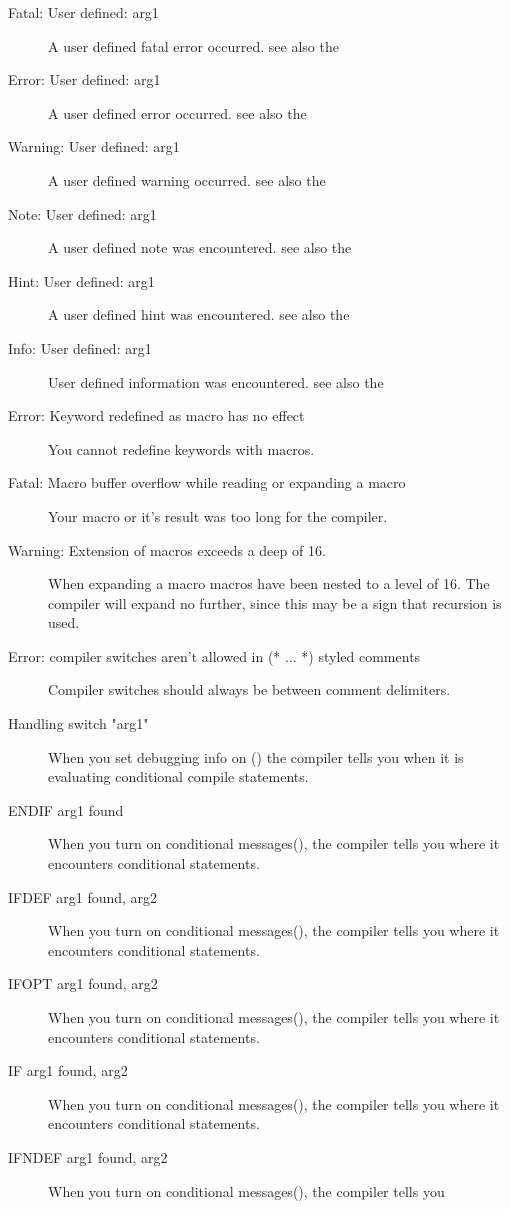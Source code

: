 \begin{description}
\item [Fatal: User defined: arg1]
 A user defined fatal error occurred. see also the \progref
\item [Error: User defined: arg1]
 A user defined error occurred. see also the \progref
\item [Warning: User defined: arg1]
 A user defined warning occurred. see also the \progref
\item [Note: User defined: arg1]
 A user defined note was encountered. see also the \progref
\item [Hint: User defined: arg1]
 A user defined hint was encountered. see also the \progref
\item [Info: User defined: arg1]
 User defined information was encountered. see also the \progref
\item [Error: Keyword redefined as macro has no effect]
 You cannot redefine keywords with macros.
\item [Fatal: Macro buffer overflow while reading or expanding a macro]
 Your macro or it's result  was too long for the compiler.
\item [Warning: Extension of macros exceeds a deep of 16.]
 When expanding a macro macros have been nested to a level of 16.
 The compiler will expand no further, since this may be a sign that 
 recursion is used.
\item [Error: compiler switches aren't allowed in (* ... *) styled comments]
 Compiler switches should always be between \var{\{ \}} comment delimiters. 
\item [Handling switch "arg1"]
 When you set debugging info on () the compiler tells you when it
 is evaluating conditional compile statements.
\item [ENDIF arg1 found]
 When you turn on conditional messages(), the compiler tells you 
 where it encounters conditional statements.
\item [IFDEF arg1 found, arg2]
 When you turn on conditional messages(), the compiler tells you 
 where it encounters conditional statements.
\item [IFOPT arg1 found, arg2]
 When you turn on conditional messages(), the compiler tells you 
 where it encounters conditional statements.
\item [IF arg1 found, arg2]
 When you turn on conditional messages(), the compiler tells you 
 where it encounters conditional statements.
\item [IFNDEF arg1 found, arg2]
 When you turn on conditional messages(), the compiler tells you 

\end{description}
